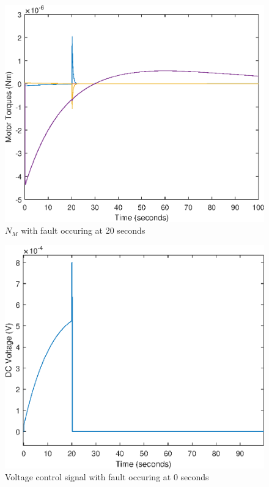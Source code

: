 \begin{figure}
	\centering
	\includegraphics[width=120mm]{figures/torque_reconfig}
	\caption{$N_M$ with fault occuring at 20 seconds}
\end{figure} 

\begin{figure}
	\centering
	\includegraphics[width=120mm]{figures/voltage_reconfig}
	\caption{Voltage control signal with fault occuring at 0 seconds}
\end{figure} 


